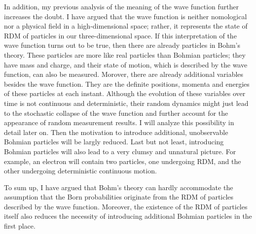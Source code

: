 In addition, my previous analysis of the meaning of the wave function further increases the doubt.
I have argued that the wave function is neither nomological nor a physical field in a high-dimensional space; rather, it represents the state of RDM of particles in our three-dimensional space. 
If this interpretation of the wave function turns out to be true, then there are already particles in Bohm's theory.
These particles are more like real particles than Bohmian particles; they have mass and charge, and their state of motion, which is described by the wave function, can also be measured.
Morover, there are already additional variables besides the wave function. They are the definite positions, momenta and energies of these particles at each instant. Although the evolution of these variables over time is not continuous and deterministic, their random dynamics might just lead to the stochastic collapse of the wave function and further account for the appearance of random measurement results. I will analyze this possibility in detail later on.
Then the motivation to introduce additional, unobservable Bohmian particles will be largly reduced.
Last but not least, introducing Bohmian particles will also lead to a very clumsy and unnatural picture. For example, an electron will contain two particles, one undergoing RDM, and the other undergoing deterministic continuous motion.

To sum up, I have argued that Bohm's theory can hardly accommodate the assumption that the Born probabilities originate from the RDM of particles described by the wave function. Moreover, the existence of the RDM of particles itself also reduces the necessity of introducing additional Bohmian particles in the first place.


